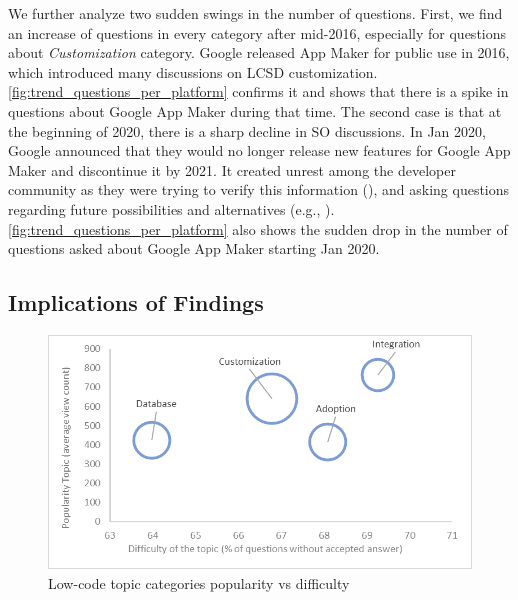 We further analyze two sudden swings in the number of questions. First, we find an increase of questions in every category after mid-2016, especially for questions about \textit{Customization} category. Google released App Maker\cite{googleappmaker} for public use in 2016, which introduced many discussions on LCSD customization. \fig\ref{fig:trend_questions_per_platform}  confirms it and shows that there is a spike in questions about Google App Maker during that time. The second case is that at the beginning of 2020, there is a sharp decline in SO discussions. In Jan 2020, Google announced that they would no longer release new features for Google App Maker and discontinue it by 2021. It created unrest among the developer community as they were trying to verify this information (), and asking questions regarding future possibilities and alternatives (e.g., ). \fig\ref{fig:trend_questions_per_platform} also shows the sudden drop in the number of questions asked about Google App Maker starting Jan 2020.



\subsection{Implications of Findings} 


\begin{figure}[t]
\centering
\includegraphics[scale=0.65]{res/bubble_diff_pop_per_category.png}
\caption{Low-code topic categories popularity vs difficulty}
\label{fig:bubble_diff_pop_per_category}
\end{figure}


